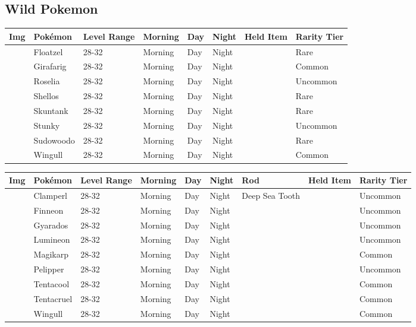 \subsection{Wild Pokemon}%
\label{subsec:WildPokemon}%
\begin{longtable}{||l l l l l l l l||}%
\hline%
Img&Pokémon&Level Range&Morning&Day&Night&Held Item&Rarity Tier\\%
\hline%
\endhead%
\hline%
&Floatzel&28{-}32&Morning&Day&Night&&Rare\\%
\hline%
&Girafarig&28{-}32&Morning&Day&Night&&Common\\%
\hline%
&Roselia&28{-}32&Morning&Day&Night&&Uncommon\\%
\hline%
&Shellos&28{-}32&Morning&Day&Night&&Rare\\%
\hline%
&Skuntank&28{-}32&Morning&Day&Night&&Rare\\%
\hline%
&Stunky&28{-}32&Morning&Day&Night&&Uncommon\\%
\hline%
&Sudowoodo&28{-}32&Morning&Day&Night&&Rare\\%
\hline%
&Wingull&28{-}32&Morning&Day&Night&&Common\\%
\hline%
\end{longtable}%
\begin{longtable}{||l l l l l l l l l||}%
\hline%
Img&Pokémon&Level Range&Morning&Day&Night&Rod&Held Item&Rarity Tier\\%
\hline%
\endhead%
\hline%
&Clamperl&28{-}32&Morning&Day&Night&Deep Sea Tooth&&Uncommon\\%
\hline%
&Finneon&28{-}32&Morning&Day&Night&&&Uncommon\\%
\hline%
&Gyarados&28{-}32&Morning&Day&Night&&&Uncommon\\%
\hline%
&Lumineon&28{-}32&Morning&Day&Night&&&Uncommon\\%
\hline%
&Magikarp&28{-}32&Morning&Day&Night&&&Common\\%
\hline%
&Pelipper&28{-}32&Morning&Day&Night&&&Uncommon\\%
\hline%
&Tentacool&28{-}32&Morning&Day&Night&&&Common\\%
\hline%
&Tentacruel&28{-}32&Morning&Day&Night&&&Common\\%
\hline%
&Wingull&28{-}32&Morning&Day&Night&&&Common\\%
\hline%
\end{longtable}